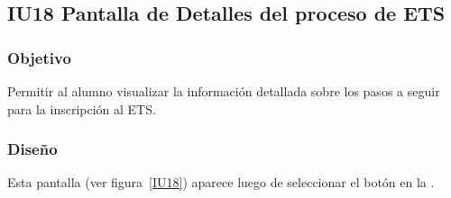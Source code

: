 \subsection{IU18 Pantalla de Detalles del proceso de ETS}

\label{IU18}
\newpage

\subsubsection{Objetivo}
Permitir al alumno visualizar la información detallada sobre los pasos a seguir para la inscripción al ETS.

\subsubsection{Diseño}
Esta pantalla  (ver figura~\ref{IU18}) aparece luego de seleccionar el botón  en la .

